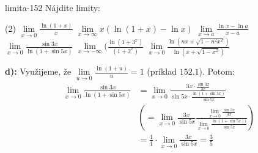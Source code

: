 \begin{defproblem}{limita-152}
Nájdite limity:
\begin{tasks}(2)
    \task $\lim\limits_{{x \rightarrow 0}} \frac{\ln(1+x)}{x}$
    \task $\lim\limits_{{x \rightarrow \infty}} x(\ln(1+x)-\ln x)$
    \task $\lim\limits_{{x \rightarrow a}} \frac{\ln x - \ln a}{x-a}$
    \task $\lim\limits_{{x \rightarrow 0}} \frac{\sin 3x}{\ln(1+\sin 5x)}$
    \task $\lim\limits_{{x \rightarrow -\infty}} (\frac{\ln (1+3^x)}{(1+2^x)}$
    \task $\lim\limits_{{x \rightarrow 0}} \frac{\ln(nx+\sqrt{1-n^2x^2})}{\ln(x+\sqrt{1-x^2})}$
\end{tasks}

\begin{solution}
    \textbf{d):}
    Využijeme, že $\lim\limits_{u \rightarrow 0}\frac{\ln(1+u)}{u}=1$ (príklad
    $152.1$). Potom:
    \begin{align*}
        \lim\limits_{x \rightarrow 0}\frac{\sin 3x}{\ln(1+\sin 5x)}
        &= \lim\limits_{x \rightarrow 0}\frac{3x \cdot \frac{\sin 3x}{3x}}{\sin 5x
            \cdot \frac{\ln (1+\sin 5x)}{\sin 5x}} \\
        &(= \lim\limits_{x \rightarrow 0}
            \frac{3x}{\sin 5x} \frac{\lim\limits_{x \rightarrow 0}\frac{\sin
            3x}{3x}}{\lim\limits_{x \rightarrow 0} \frac{\ln(1+\sin 5x))}{\sin
            5x}}) \\
        &= \frac{1}{1}\cdot \lim\limits_{x \rightarrow 0}\frac{3x}{\sin 5x}
         = \frac{3}{5}
    \end{align*}
\end{solution}
\end{defproblem}

